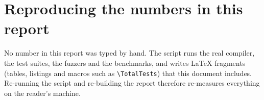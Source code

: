 \section{Reproducing the numbers in this report}\label{sec:reproduce}
No number in this report was typed by hand. The script  runs the real compiler, the test suites, the fuzzers and the benchmarks, and writes LaTeX fragments (tables, listings and macros such as \verb|\TotalTests|) that this document includes. Re-running the script and re-building the report therefore re-measures everything on the reader's machine.
